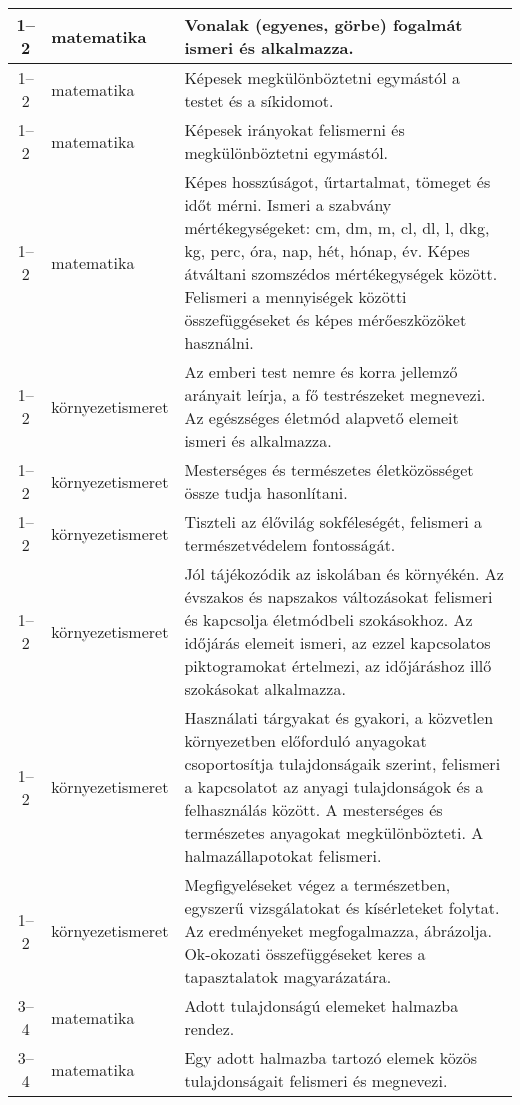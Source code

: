 \begin{small}
\begin{longtable}{c | p{2cm} |  p{11cm} }
              1--2 & matematika & Vonalak (egyenes, görbe) fogalmát ismeri és alkalmazza. \\ \hline
              1--2 & matematika & Képesek megkülönböztetni egymástól a testet és a síkidomot. \\ \hline
              1--2 & matematika & Képesek irányokat felismerni és megkülönböztetni egymástól. \\ \hline
              1--2 & matematika & Képes hosszúságot, űrtartalmat, tömeget és időt mérni. Ismeri a szabvány mértékegységeket: cm, dm, m, cl, dl, l, dkg, kg, perc, óra, nap, hét, hónap, év. Képes átváltani szomszédos mértékegységek között. Felismeri a mennyiségek közötti összefüggéseket és képes mérőeszközöket használni. \\ \hline
              1--2 & környezetismeret & Az emberi test nemre és korra jellemző arányait leírja, a fő testrészeket megnevezi. Az egészséges életmód alapvető elemeit ismeri és alkalmazza. \\ \hline
              1--2 & környezetismeret & Mesterséges és természetes életközösséget össze tudja hasonlítani. \\ \hline
              1--2 & környezetismeret & Tiszteli az élővilág sokféleségét, felismeri a természetvédelem fontosságát. \\ \hline
              1--2 & környezetismeret & Jól tájékozódik az iskolában és környékén. Az évszakos és napszakos változásokat felismeri és kapcsolja életmódbeli szokásokhoz. Az időjárás elemeit ismeri, az ezzel kapcsolatos piktogramokat értelmezi, az időjáráshoz illő szokásokat alkalmazza. \\ \hline
              1--2 & környezetismeret & Használati tárgyakat és gyakori, a közvetlen környezetben előforduló anyagokat csoportosítja tulajdonságaik szerint, felismeri a kapcsolatot az anyagi tulajdonságok és a felhasználás között. A mesterséges és természetes anyagokat megkülönbözteti. A halmazállapotokat felismeri. \\ \hline
              1--2 & környezetismeret & Megfigyeléseket végez a természetben, egyszerű vizsgálatokat és kísérleteket  folytat. Az eredményeket megfogalmazza, ábrázolja. Ok-okozati összefüggéseket keres a tapasztalatok magyarázatára. \\ \hline
              3--4 & matematika & Adott tulajdonságú elemeket halmazba rendez. \\ \hline
              3--4 & matematika & Egy adott halmazba tartozó elemek közös tulajdonságait felismeri és megnevezi. \\ \hline

\end{longtable}
\end{small}
